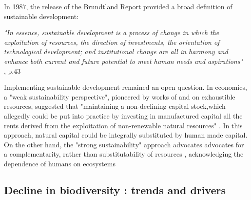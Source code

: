\clearpage
\begin{tcolorbox}[breakable, 
colback=verylightgray, 
colframe=gray!75!black, 
title= {Box 1 - Weak v. Strong Sustainability},
fontupper=\small]
\par %
\justifying %

In 1987, the release of the Brundtland Report \citep{brundtland} provided a broad definition of sustainable development: 

\begin{displayquote}
\textit{"In essence, sustainable development is a process of change in which the exploitation of
resources, the direction of investments, the orientation of technological development; and institutional change are all in harmony and enhance both current and future potential to meet human needs and aspirations"}\\
\small{\cite{brundtland}, p.43}
\end{displayquote}

Implementing sustainable development remained an open question. In economics, a "weak sustainability perspective", pioneered by works of \cite{hartwick_intergenerational_1977} and \cite{solow_intergenerational_1986} on exhaustible resources, suggested that "maintaining a non-declining capital stock,which allegedly could be put into practice by investing in manufactured capital all the rents derived from the exploitation of non-renewable natural resources" \citep{gomez_history_2010}. In this approach, natural capital could be integrally substituted by human made capital. On the other hand, the "strong sustainability" approach advocates advocates for a complementarity, rather than substitutability of resources \citep{costanza_daly}, acknowledging the dependence of humans on ecosystems
\end{tcolorbox}


\subsection*{Decline in biodiversity : trends and drivers}

